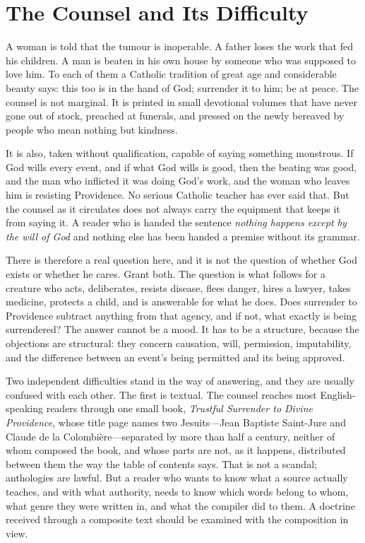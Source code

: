\section{The Counsel and Its Difficulty}

A woman is told that the tumour is inoperable. A father loses the work that fed his children. A man is beaten in his own house by someone who was supposed to love him. To each of them a Catholic tradition of great age and considerable beauty says: this too is in the hand of God; surrender it to him; be at peace. The counsel is not marginal. It is printed in small devotional volumes that have never gone out of stock, preached at funerals, and pressed on the newly bereaved by people who mean nothing but kindness.

It is also, taken without qualification, capable of saying something monstrous. If God wills every event, and if what God wills is good, then the beating was good, and the man who inflicted it was doing God's work, and the woman who leaves him is resisting Providence. No serious Catholic teacher has ever said that. But the counsel as it circulates does not always carry the equipment that keeps it from saying it. A reader who is handed the sentence \emph{nothing happens except by the will of God} and nothing else has been handed a premise without its grammar.

There is therefore a real question here, and it is not the question of whether God exists or whether he cares. Grant both. The question is what follows for a creature who acts, deliberates, resists disease, flees danger, hires a lawyer, takes medicine, protects a child, and is answerable for what he does. Does surrender to Providence subtract anything from that agency, and if not, what exactly is being surrendered? The answer cannot be a mood. It has to be a structure, because the objections are structural: they concern causation, will, permission, imputability, and the difference between an event's being permitted and its being approved.

Two independent difficulties stand in the way of answering, and they are usually confused with each other. The first is textual. The counsel reaches most English-speaking readers through one small book, \emph{Trustful Surrender to Divine Providence}, whose title page names two Jesuits---Jean Baptiste Saint-Jure and Claude de la Colombière---separated by more than half a century, neither of whom composed the book, and whose parts are not, as it happens, distributed between them the way the table of contents says. That is not a scandal; anthologies are lawful. But a reader who wants to know what a source actually teaches, and with what authority, needs to know which words belong to whom, what genre they were written in, and what the compiler did to them. A doctrine received through a composite text should be examined with the composition in view.

